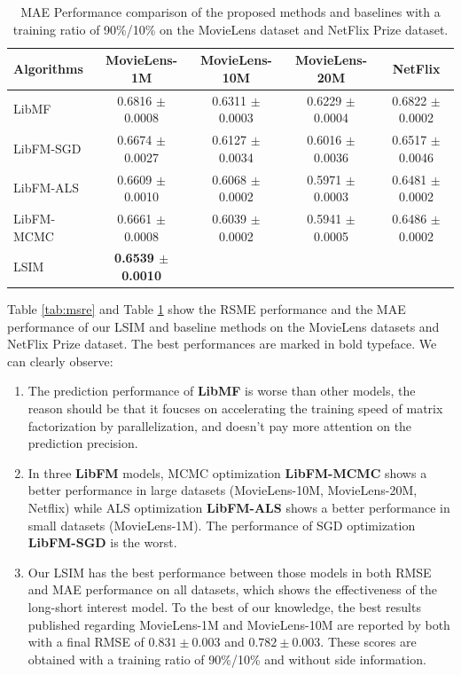 \documentclass{sig-alternate-05-2015}
\begin{document}
\begin{table}[htpb]
	\centering
	\caption{MAE Performance comparison of the proposed methods and baselines with a training ratio of 90\%/10\%
    on the MovieLens dataset and NetFlix Prize dataset.}
	\label{tab:mae}
	\begin{tabular}{|l|c|c|c|c|}
		\hline
		\textbf{Algorithms} & \textbf{MovieLens-1M} & \textbf{MovieLens-10M} & \textbf{MovieLens-20M}  & \textbf{NetFlix} \\
		\hline
		LibMF      & 0.6816 $\pm$ 0.0008 & 0.6311 $\pm$ 0.0003 & 0.6229 $\pm$ 0.0004 & 0.6822 $\pm$ 0.0002 \\
		LibFM-SGD  & 0.6674 $\pm$ 0.0027 & 0.6127 $\pm$ 0.0034 & 0.6016 $\pm$ 0.0036 & 0.6517 $\pm$ 0.0046 \\
		LibFM-ALS  & 0.6609 $\pm$ 0.0010 & 0.6068 $\pm$ 0.0002 & 0.5971 $\pm$ 0.0003 & 0.6481 $\pm$ 0.0002 \\
        LibFM-MCMC & 0.6661 $\pm$ 0.0008 & 0.6039 $\pm$ 0.0002 & 0.5941 $\pm$ 0.0005 & 0.6486 $\pm$ 0.0002 \\
		LSIM       & \textbf{0.6539 $\pm$ 0.0010} &  &  & \\
		\hline
	\end{tabular}
\end{table}

Table \ref{tab:msre} and Table \ref{tab:mae} show the RSME performance and the MAE performance
of our LSIM and baseline methods on the MovieLens datasets and NetFlix Prize dataset.
The best performances are marked in bold typeface.
We can clearly observe:
\begin{enumerate}
\item The prediction performance of \textbf{LibMF} is worse than other models, the reason
should be that it foucses on accelerating the training speed of matrix factorization by
parallelization, and doesn't pay more attention on the prediction precision.
\item In three \textbf{LibFM} models, MCMC optimization \textbf{LibFM-MCMC} shows
a better performance in large datasets (MovieLens-10M, MovieLens-20M, Netflix) while
ALS optimization \textbf{LibFM-ALS} shows a better performance in small datasets (MovieLens-1M).
The performance of SGD optimization \textbf{LibFM-SGD} is the worst.
\item Our LSIM has the best performance between those models in both RMSE and MAE performance on all datasets,
which shows the effectiveness of the long-short interest model.
To the best of our knowledge, the best results published regarding MovieLens-1M and MovieLens-10M
are reported by both \cite{lee2013local, sedhain2015autorec} with a final RMSE of $0.831 \pm 0.003$
and $0.782 \pm 0.003$. These scores are obtained with a training ratio of 90\%/10\% and without side information.
\end{enumerate}
\end{document}
